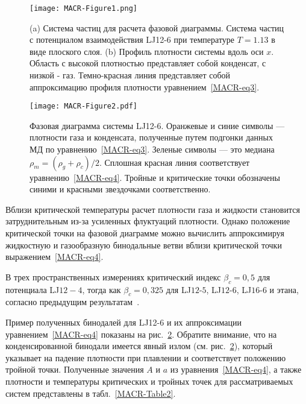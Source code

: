 \begin{figure}[!t]
\centering
 \texttt{[image: MACR-Figure1.png]}
 \caption{(a) Система частиц для расчета фазовой диаграммы. Система частиц с потенциалом взаимодействия LJ12-6 при температуре $T=1.13$ в виде плоского слоя.
   (b) Профиль плотности системы вдоль оси $x$. Область с высокой плотностью представляет собой конденсат, с низкой - газ. Темно-красная линия представляет собой аппроксимацию профиля плотности уравнением~\eqref{MACR-eq3}.}
\label{MACR-Figure1}
\end{figure}


\begin{figure}[!t]
\centering
 \texttt{[image: MACR-Figure2.pdf]}
 \caption{Фазовая диаграмма системы LJ12-6.
  Оранжевые и синие символы — плотности газа и конденсата, полученные путем подгонки данных МД по уравнению~\eqref{MACR-eq3}.
  Зеленые символы — это медиана $\rho_m=(\rho_g+\rho_c)/2$.
  Сплошная красная линия соответствует уравнению~\eqref{MACR-eq4}.
  Тройные и критические точки обозначены синими и красными звездочками соответственно.
 }
\label{MACR-Figure2}
\end{figure}

Вблизи критической температуры расчет плотности газа и жидкости становится затруднительным из-за усиленных флуктуаций плотности.
Однако положение критической точки на фазовой диаграмме можно вычислить аппроксимируя жидкостную и газообразную бинодальные ветви вблизи критической точки выражением~\ref{MACR-eq4}.

В трех пространственных измерениях критический индекс $\beta_c = 0,5$ для потенциала LJ$12-4$, тогда как $\beta_c = 0,325$ для LJ$12$-$5$, LJ$12$-$6$, LJ$16$-$6$ и этана, согласно предыдущим результатам~\cite{10.1021/acs.jced.6b01036,10.1021/jp9072137,10.1103/physrevlett.89.025703}.

Пример полученных бинодалей для LJ12-6 и их аппроксимации уравнением~\eqref{MACR-eq4} показаны на рис.~\ref{MACR-Figure2}.
Обратите внимание, что на конденсированной бинодали имеется явный излом (см. рис.~\ref{MACR-Figure2}), который указывает на падение плотности при плавлении и соответствует положению тройной точки.
Полученные значения $A$ и $a$ из уравнения~\eqref{MACR-eq4}, а также плотности и температуры критических и тройных точек для рассматриваемых систем представлены в табл.~\ref{MACR-Table2}.

